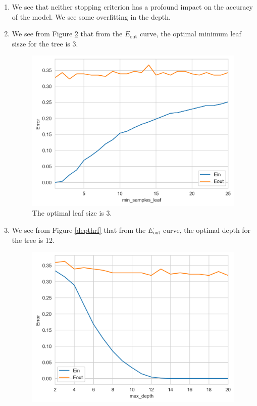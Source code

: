 \documentclass[12pt]{article}
\newcommand{\Eout}{E_{\text{out}}}
\begin{document}
\begin{enumerate}[leftmargin=*]
\begin{enumerate}[label=\Alph*.]
\begin{figure}[h!]
\caption{The optimal depth is 2.} \label{depth}
\end{figure}
\item We see that neither stopping criterion has a profound impact on the accuracy of the model. We see some overfitting in the depth.
\item We see from Figure \ref{leafrf} that from the $\Eout$ curve, the optimal minimum leaf sisze for the tree is 3.
\begin{figure}[h!]
\centering
\includegraphics[scale=0.5]{Set3Figures/minleafsizerf.png}
\caption{The optimal leaf size is 3.} \label{leafrf}
\end{figure}
\item We see from Figure \ref{depthrf} that from the $\Eout$ curve, the optimal depth for the tree is 12.
\begin{figure}[h!]
\centering
\includegraphics[scale=0.5]{Set3Figures/maxdepthrf.png}

\end{figure}
\end{enumerate}
\end{enumerate}
\end{document}
